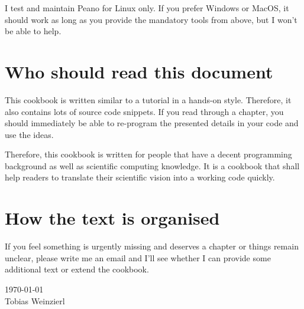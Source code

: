 \noindent
I test and maintain Peano for Linux only.
If you prefer Windows or MacOS, it should work as long as you provide the
mandatory tools from above, but I won't be able to help.


\section*{Who should read this document}

This cookbook is written similar to a tutorial in a hands-on style.
Therefore, it also contains lots of source code snippets.
If you read through a chapter, you should immediately be able to re-program the
presented details in your code and use the ideas.

Therefore, this cookbook is written for people that have a decent programming
background as well as scientific computing knowledge.
It is a cookbook that shall help readers to translate their scientific vision
into a working code quickly.


\section*{How the text is organised}

If you feel something is urgently missing and deserves a chapter or things
remain unclear, please write me an email and I'll see whether I can provide some
additional text or extend the cookbook.


{
  \flushright
  \today 
  \\ 
  Tobias Weinzierl 
  \\
}

 